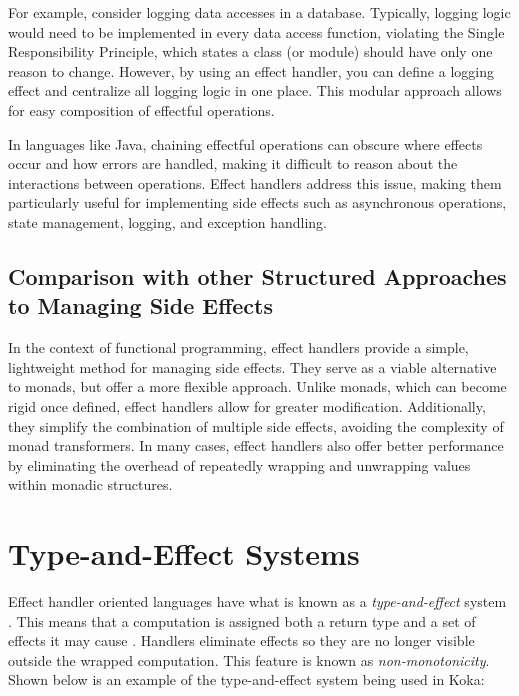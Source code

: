 \documentclass[logo,bsc,singlespacing,parskip]{infthesis}
\begin{document}
For example, consider logging data accesses in a database. Typically, logging logic would need to be implemented in every data access function, violating the Single Responsibility Principle, which states a class (or module) should have only one reason to change. However, by using an effect handler, you can define a logging effect and centralize all logging logic in one place. This modular approach allows for easy composition of effectful operations. 

In languages like Java, chaining effectful operations can obscure where effects occur and how errors are handled, making it difficult to reason about the interactions between operations. Effect handlers address this issue, making them particularly useful for implementing side effects such as asynchronous operations, state management, logging, and exception handling. 

\subsection{Comparison with other Structured Approaches to Managing Side Effects}


In the context of functional programming, effect handlers provide a simple, lightweight method for managing side effects. They serve as a viable alternative to monads, but offer a more flexible approach. Unlike monads, which can become rigid once defined, effect handlers allow for greater modification. Additionally, they simplify the combination of multiple side effects, avoiding the complexity of monad transformers. In many cases, effect handlers also offer better performance by eliminating the overhead of repeatedly wrapping and unwrapping values within monadic structures. 


\section{Type-and-Effect Systems}

Effect handler oriented languages have what is known as a \textit{type-and-effect} system \cite{bauer_effect_2013}. This means that a computation is assigned both a return type and a set of effects it may cause \cite{kammar2014algebraic}. Handlers eliminate effects so they are no longer visible outside the wrapped computation.
This feature is known as \textit{non-monotonicity}. Shown below is an example of the type-and-effect system being used in Koka:


\end{document}
